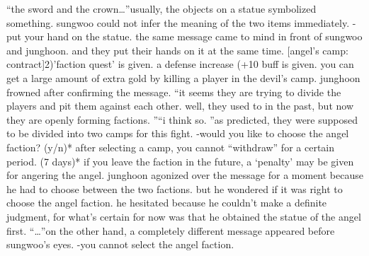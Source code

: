 “the sword and the crown…”usually, the objects on a statue symbolized something.
sungwoo could not infer the meaning of the two items immediately.
-put your hand on the statue.
the same message came to mind in front of sungwoo and junghoon.
and they put their hands on it at the same time.
[angel’s camp: contract]2)’faction quest’ is given.
a defense increase (+10%
 buff is given.
you can get a large amount of extra gold by killing a player in the devil’s camp.
junghoon frowned after confirming the message.
“it seems they are trying to divide the players and pit them against each other.
 well, they used to in the past, but now they are openly forming factions.
”“i think so.
”as predicted, they were supposed to be divided into two camps for this fight.
-would you like to choose the angel faction? (y/n)* after selecting a camp, you cannot “withdraw” for a certain period.
 (7 days)* if you leave the faction in the future, a ‘penalty’ may be given for angering the angel.
junghoon agonized over the message for a moment because he had to choose between the two factions.
but he wondered if it was right to choose the angel faction.
 he hesitated because he couldn’t make a definite judgment, for what’s certain for now was that he obtained the statue of the angel first.
“…”on the other hand, a completely different message appeared before sungwoo’s eyes.
-you cannot select the angel faction.

